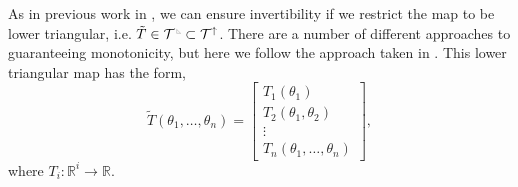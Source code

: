 \documentclass[final]{siamltex}
\newcommand{\edit}[1]{{\color{red} #1}}
\newcommand{\ltri}{%
\,\resizebox{!}{0.25\baselineskip}{%
\begin{tikzpicture}%
\draw[line width=1mm](0,0) -- (0,2) -- (2,0)  -- (0,0);
\end{tikzpicture}%
}\xspace%
}%
\begin{document}
As in previous work in \cite{parno2018transport}, we can ensure
invertibility if we restrict the map to be \edit{lower triangular\cite{bogachev2005triangular}}, i.e. $\tilde{T} \in \mathcal{T}^{\ltri}\subset\mathcal{T}^\uparrow$. \edit{There are a number of different
  approaches to guaranteeing monotonicity\cite{y.17:_handb_uncer_quant}, but here we follow
  the approach taken in \cite{parno2018transport}.} This lower triangular map has the form,
\begin{equation}
	\tilde{T}(\theta_1, \dots, \theta_n) = \begin{bmatrix} T_1(\theta_1) \\ T_2(\theta_1, \theta_2) \\ \vdots \\
		T_n(\theta_1, \dots, \theta_n) \end{bmatrix},
\end{equation}
where $T_i\colon \mathbb{R}^i \to \mathbb{R}$. %
\end{document}
